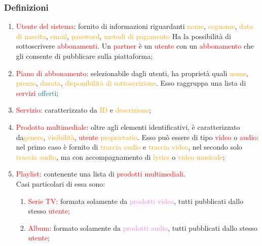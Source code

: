 \subsubsection{Definizioni}
\begin{enumerate}
    \item \textcolor{red}{Utente del sistema}: fornito di informazioni riguardanti \textcolor{orange}{nome}, \textcolor{orange}{cognome},
    \textcolor{orange}{data di nascita}, \textcolor{orange}{email}, \textcolor{orange}{password}, \textcolor{orange}{metodi di pagamento}
    Ha la possibilità di sottoscrivere \textcolor{red}{abbonamenti}. Un \textcolor{red}{partner} è un \textcolor{red}{utente} con un \textcolor{red}{abbonamento} che gli consente di pubblicare sulla piattaforma;
    \item \textcolor{red}{Piano di abbonamento}: selezionabile dagli utenti, ha proprietà quali \textcolor{orange}{nome},
    \textcolor{orange}{prezzo}, \textcolor{orange}{durata}, \textcolor{orange}{disponibilità di sottoscrizione}.
    Esso raggruppa una lista di \textcolor{red}{servizi} \textcolor{teal}{offerti};
    \item \textcolor{red}{Servizio}: caratterizzato da \textcolor{orange}{ID} e \textcolor{orange}{descrizione};
    \item \textcolor{red}{Prodotto multimediale}: oltre agli elementi identificativi, è caratterizzato da\textcolor{orange}{genere},
    \textcolor{orange}{visibilità}, \textcolor{red}{utente} \textcolor{orange}{proprietario}. Esso può essere di tipo
    \textcolor{red}{video} o \textcolor{red}{audio}: nel primo caso è fornito di \textcolor{orange}{traccia audio} e
    \textcolor{orange}{traccia video}, nel secondo solo \textcolor{orange}{traccia audio}, ma con accompagnamento di
    \textcolor{orange}{lyrics} o \textcolor{orange}{video musicale};
    \item \textcolor{red}{Playlist}: contenente una lista di \textcolor{red}{prodotti multimediali}.\\
    Casi particolari di essa sono:
    \begin{enumerate}
        \item \textcolor{red}{Serie TV}: formata solamente da \textcolor{violet}{prodotti video}, tutti pubblicati dallo stesso \textcolor{red}{utente};
        \item \textcolor{red}{Album}: formato solamente da \textcolor{violet}{prodotti audio}, tutti pubblicati dallo stesso \textcolor{red}{utente};
    \end{enumerate}

\end{enumerate}
